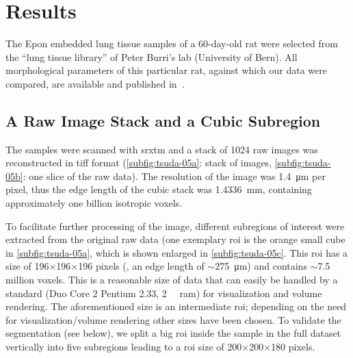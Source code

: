 \section{Results}
The Epon embedded lung tissue samples of a 60-day-old rat were selected from the ``lung tissue library'' of Peter Burri's lab (University of Bern). All morphological parameters of this particular rat, against which our data were compared, are available and published in~\citet{Tschanz2003}.

\subsection{A Raw Image Stack and a Cubic Subregion}
The samples were scanned with \ac{srxtm} and a stack of 1024 raw images was reconstructed in tiff format (\autoref{subfig:tsuda-05a}: stack of images, \ref{subfig:tsuda-05b}: one slice of the raw data). The resolution of the image was \SI{1.4}{\micro\meter} per pixel, thus the edge length of the cubic stack was \SI{1.4336}{\milli\meter}, containing approximately one billion isotropic voxels.

To facilitate further processing of the image, different subregions of interest were extracted from the original raw data (one exemplary \ac{roi} is the orange small cube in \autoref{subfig:tsuda-05a}, which is shown enlarged in \autoref{subfig:tsuda-05c}. This \ac{roi} has a size of 196$\times$196$\times$196 pixels (\ie, an edge length of $\sim$\SI{275}{\micro\meter}) and contains $\sim$7.5 million voxels. This is a reasonable size of data that can easily be handled by a standard  (Duo Core 2 Pentium \SI{2.33}{\gigahertz}, \SI{2}{\giga\byte} \acs{ram}) for visualization and volume rendering. The aforementioned size is an intermediate \ac{roi}; depending on the need for visualization/volume rendering other sizes have been chosen. To validate the segmentation (see below), we split a big \ac{roi} inside the sample in the full dataset vertically into five subregions leading to a \ac{roi} size of 200$\times$200$\times$180 pixels.

